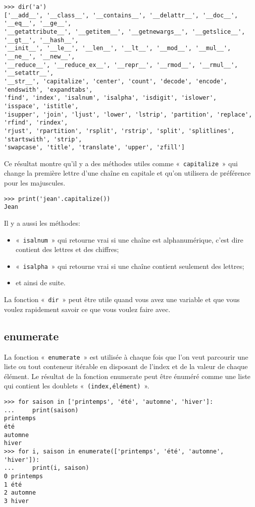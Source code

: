 \begin{footnotesize}
\begin{Verbatim}[frame=single,rulecolor=\color{gray}]
>>> dir('a')
['__add__', '__class__', '__contains__', '__delattr__', '__doc__', '__eq__', '__ge__', 
'__getattribute__', '__getitem__', '__getnewargs__', '__getslice__', '__gt__', '__hash__',
'__init__', '__le__', '__len__', '__lt__', '__mod__', '__mul__', '__ne__', '__new__', 
'__reduce__', '__reduce_ex__', '__repr__', '__rmod__', '__rmul__', '__setattr__', 
'__str__', 'capitalize', 'center', 'count', 'decode', 'encode', 'endswith', 'expandtabs', 
'find', 'index', 'isalnum', 'isalpha', 'isdigit', 'islower', 'isspace', 'istitle', 
'isupper', 'join', 'ljust', 'lower', 'lstrip', 'partition', 'replace', 'rfind', 'rindex', 
'rjust', 'rpartition', 'rsplit', 'rstrip', 'split', 'splitlines', 'startswith', 'strip', 
'swapcase', 'title', 'translate', 'upper', 'zfill']
\end{Verbatim}
\end{footnotesize}

Ce résultat montre qu'il y a des méthodes utiles comme «~\texttt{capitalize}~» qui change la première lettre d'une chaîne en capitale et qu'on utilisera de préférence pour les majuscules.

\begin{Verbatim}[frame=single,rulecolor=\color{gray}]
>>> print('jean'.capitalize())
Jean
\end{Verbatim}

Il y a aussi les méthodes:
\begin{itemize} 
\item «~\texttt{isalnum}~» qui retourne vrai si une chaîne est alphanumérique, c'est dire contient des lettres et des chiffres;
\item «~\texttt{isalpha}~» qui retourne vrai si une chaîne contient seulement des lettres;
\item et ainsi de suite.
\end{itemize}  

La fonction «~\texttt{dir}~» peut être utile quand vous avez une variable et que vous voulez rapidement savoir ce que vous voulez faire avec.


\subsection*{enumerate}
La fonction «~\texttt{enumerate}~» est utilisée à chaque fois que l'on veut parcourir une liste ou tout conteneur itérable en disposant de l'index et de la valeur de chaque élément. Le résultat de la fonction enumerate peut être énuméré comme une liste qui contient les doublets «~\texttt{(index,élément)}~». 
\begin{small}
\begin{Verbatim}[frame=single,rulecolor=\color{gray}]
>>> for saison in ['printemps', 'été', 'automne', 'hiver']:
...     print(saison)
printemps
été
automne
hiver
>>> for i, saison in enumerate(['printemps', 'été', 'automne', 'hiver']):
...     print(i, saison)
0 printemps
1 été
2 automne
3 hiver
\end{Verbatim}
\end{small}

